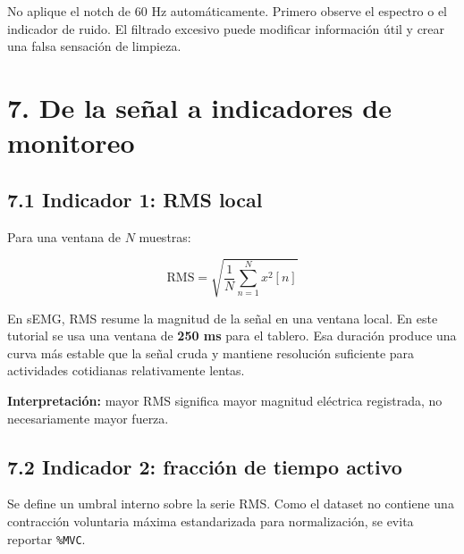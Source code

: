 \documentclass[
  spanish,
  a4paper,
  DIV=11,
  numbers=noendperiod]{scrreprt}
\begin{document}
\begin{tcolorbox}[enhanced jigsaw, arc=.35mm, bottomrule=.15mm, bottomtitle=1mm, breakable, colback=white, colbacktitle=quarto-callout-tip-color!10!white, colframe=quarto-callout-tip-color-frame, coltitle=black, left=2mm, leftrule=.75mm, opacityback=0, opacitybacktitle=0.6, rightrule=.15mm, title=\textcolor{quarto-callout-tip-color}{\faLightbulb}\hspace{0.5em}{Decisión de ingeniería}, titlerule=0mm, toprule=.15mm, toptitle=1mm]

No aplique el notch de 60 Hz automáticamente. Primero observe el
espectro o el indicador de ruido. El filtrado excesivo puede modificar
información útil y crear una falsa sensación de limpieza.

\end{tcolorbox}

\chapter{7. De la señal a indicadores de
monitoreo}\label{de-la-seuxf1al-a-indicadores-de-monitoreo}

\section{7.1 Indicador 1: RMS local}\label{indicador-1-rms-local}

Para una ventana de \(N\) muestras:

\[
\mathrm{RMS}=\sqrt{\frac{1}{N}\sum_{n=1}^{N}x^2[n]}
\]

En sEMG, RMS resume la magnitud de la señal en una ventana local. En
este tutorial se usa una ventana de \textbf{250 ms} para el tablero. Esa
duración produce una curva más estable que la señal cruda y mantiene
resolución suficiente para actividades cotidianas relativamente lentas.

\textbf{Interpretación:} mayor RMS significa mayor magnitud eléctrica
registrada, no necesariamente mayor fuerza.

\section{7.2 Indicador 2: fracción de tiempo
activo}\label{indicador-2-fracciuxf3n-de-tiempo-activo}

Se define un umbral interno sobre la serie RMS. Como el dataset no
contiene una contracción voluntaria máxima estandarizada para
normalización, se evita reportar \texttt{\%MVC}.
\end{document}
